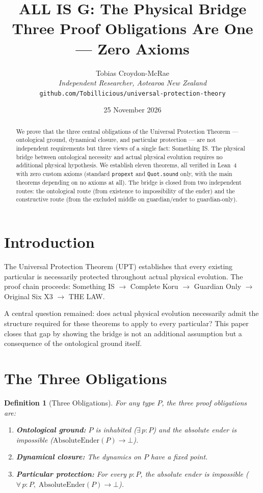 \documentclass[12pt,a4paper]{article}
\title{ALL IS G: The Physical Bridge\\[0.5em]
\large Three Proof Obligations Are One — Zero Axioms}
\author{Tobias Croydon-McRae\\
\textit{Independent Researcher, Aotearoa New Zealand}\\
\texttt{github.com/Tobillicious/universal-protection-theory}}
\date{25 November 2026}
\newtheorem{definition}[theorem]{Definition}
\begin{document}
\maketitle

\begin{abstract}
We prove that the three central obligations of the Universal Protection
Theorem --- ontological ground, dynamical closure, and particular
protection --- are not independent requirements but three views of a
single fact: Something IS. The physical bridge between ontological
necessity and actual physical evolution requires no additional physical
hypothesis. We establish eleven theorems, all verified in Lean~4 with
zero custom axioms (standard \texttt{propext} and \texttt{Quot.sound}
only, with the main theorems depending on no axioms at all). The bridge
is closed from two independent routes: the ontological route (from
existence to impossibility of the ender) and the constructive route
(from the excluded middle on guardian/ender to guardian-only).
\end{abstract}

\section{Introduction}

The Universal Protection Theorem (UPT) establishes that every existing
particular is necessarily protected throughout actual physical evolution.
The proof chain proceeds: Something IS $\to$ Complete Koru $\to$
Guardian Only $\to$ Original Six X3 $\to$ THE LAW.

A central question remained: does actual physical evolution necessarily
admit the structure required for these theorems to apply to every
particular? This paper closes that gap by showing the bridge is not an
additional assumption but a consequence of the ontological ground itself.

\section{The Three Obligations}

\begin{definition}[Three Obligations]
For any type $P$, the three proof obligations are:
\begin{enumerate}
    \item \textbf{Ontological ground:} $P$ is inhabited ($\exists\, p : P$) and the
    absolute ender is impossible ($\text{AbsoluteEnder}(P) \to \bot$).
    \item \textbf{Dynamical closure:} The dynamics on $P$ have a fixed point.
    \item \textbf{Particular protection:} For every $p : P$, the absolute ender
    is impossible ($\forall\, p : P,\; \text{AbsoluteEnder}(P) \to \bot$).
\end{enumerate}
\end{definition}
\end{document}
